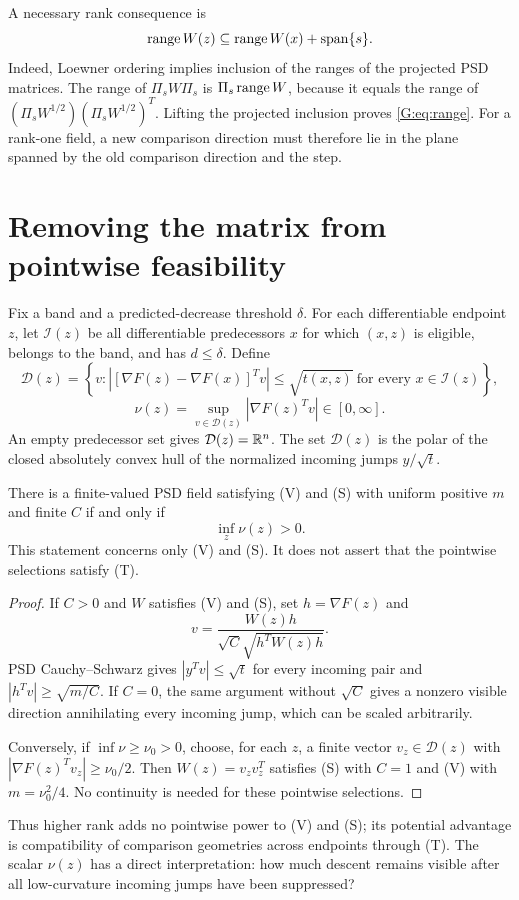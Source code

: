 A necessary rank consequence is
\begin{equation}
 \operatorname{range} W(z)\subseteq\operatorname{range} W(x)+\operatorname{span}\{s\}. \label{G:eq:range}
\end{equation}
Indeed, Loewner ordering implies inclusion of the ranges of the projected PSD matrices. The range of $\Pi_sW\Pi_s$ is $\Pi_s\operatorname{range} W$, because it equals the range of $(\Pi_sW^{1/2})(\Pi_sW^{1/2})^T$. Lifting the projected inclusion proves \eqref{G:eq:range}. For a rank-one field, a new comparison direction must therefore lie in the plane spanned by the old comparison direction and the step.


\setcounter{section}{2}
\setcounter{theorem}{0}
\setcounter{equation}{3}


\section{Removing the matrix from pointwise feasibility}

Fix a band and a predicted-decrease threshold $\delta$. For each differentiable endpoint $z$, let $\mathcal I(z)$ be all differentiable predecessors $x$ for which $(x,z)$ is eligible, belongs to the band, and has $d\le\delta$. Define
\[
 \mathcal D(z)=\left\{v:\left|[\nabla F(z)-\nabla F(x)]^Tv\right|
       \le\sqrt{t(x,z)}\ \text{for every }x\in\mathcal I(z)\right\},
\]
\begin{equation}
 \nu(z)=\sup_{v\in\mathcal D(z)}|\nabla F(z)^Tv|\in[0,\infty]. \label{G:eq:nu}
\end{equation}
An empty predecessor set gives $\mathcal D(z)=\mathbb R^n$. The set $\mathcal D(z)$ is the polar of the closed absolutely convex hull of the normalized incoming jumps $y/\sqrt t$.

\begin{proposition}
There is a finite-valued PSD field satisfying (V) and (S) with uniform positive $m$ and finite $C$ if and only if
\[
 \inf_z\nu(z)>0.
\]
This statement concerns only (V) and (S). It does not assert that the pointwise selections satisfy (T).
\end{proposition}
\begin{proof}
If $C>0$ and $W$ satisfies (V) and (S), set $h=\nabla F(z)$ and
\[
 v=\frac{W(z)h}{\sqrt C\sqrt{h^TW(z)h}}.
\]
PSD Cauchy--Schwarz gives $|y^Tv|\le\sqrt t$ for every incoming pair and
$|h^Tv|\ge\sqrt{m/C}$. If $C=0$, the same argument without $\sqrt C$ gives a nonzero visible direction annihilating every incoming jump, which can be scaled arbitrarily.

Conversely, if $\inf\nu\ge\nu_0>0$, choose, for each $z$, a finite vector $v_z\in\mathcal D(z)$ with $|\nabla F(z)^Tv_z|\ge\nu_0/2$. Then $W(z)=v_zv_z^T$ satisfies (S) with $C=1$ and (V) with $m=\nu_0^2/4$. No continuity is needed for these pointwise selections.
\end{proof}
Thus higher rank adds no pointwise power to (V) and (S); its potential advantage is compatibility of comparison geometries across endpoints through (T). The scalar $\nu(z)$ has a direct interpretation: how much descent remains visible after all low-curvature incoming jumps have been suppressed?

